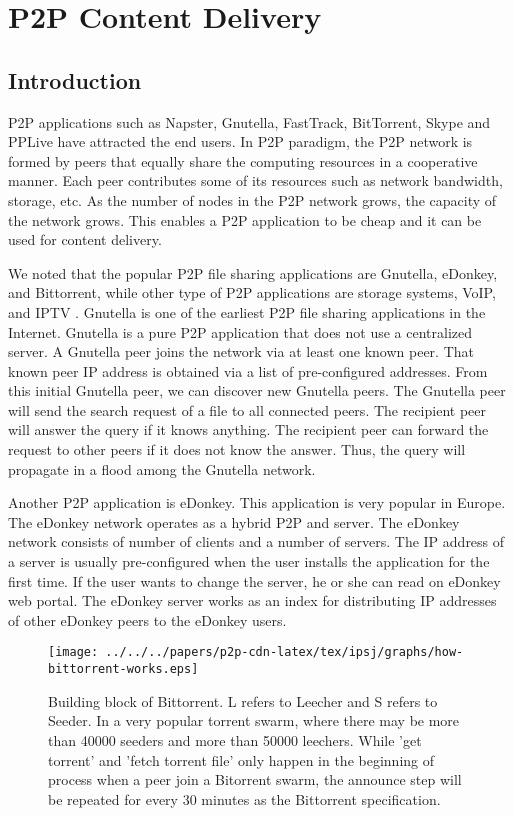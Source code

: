 \chapter{P2P Content Delivery}
\section{Introduction}

P2P applications such as Napster, Gnutella, FastTrack, BitTorrent, Skype and PPLive have attracted the end users.
In P2P paradigm, the P2P network is formed by peers that equally share the computing resources in a cooperative manner.
Each peer contributes some of its resources such as network bandwidth, storage, etc. 
As the number of nodes in the P2P network grows, the capacity of the network grows. 
This enables a P2P application to be cheap and it can be used for content delivery.  

We noted that the popular P2P file sharing applications are Gnutella, eDonkey, and Bittorrent, while other type of P2P applications are storage systems, VoIP, and IPTV \cite{5360707}.
Gnutella is one of the earliest P2P file sharing applications in the Internet.
Gnutella is a pure P2P application that does not use a centralized server.
A Gnutella peer joins the network via at least one known peer.
That known peer IP address is obtained via a list of pre-configured addresses. 
From this initial Gnutella peer, we can discover new Gnutella peers.
The Gnutella peer will send the search request of a file to all connected peers. 
The recipient peer will answer the query if it knows anything. 
The recipient peer can forward the request to other peers if it does not know the answer.
Thus, the query will propagate in a flood among the Gnutella network.

Another P2P application is eDonkey.  
This application is very popular in Europe. 
The eDonkey network operates as a hybrid P2P and server. 
The eDonkey network consists of number of  clients and a number of servers. 
The IP address of a server is usually pre-configured when the user installs the application for the first time.  
If the user wants to change the server, he or she can read on eDonkey web portal.
The eDonkey server works as an index for distributing IP addresses of other eDonkey peers to the eDonkey users.

\begin{figure}[tb]
\begin{center}
\texttt{[image: ../../../papers/p2p-cdn-latex/tex/ipsj/graphs/how-bittorrent-works.eps]}
\end{center}
\caption{Building block of Bittorrent. 
L refers to Leecher and S refers to Seeder. 
In a very popular torrent swarm, where there may be more than 40000 seeders and more than 50000 leechers.
While 'get torrent' and 'fetch torrent file' only happen in the beginning of process when a peer join a Bitorrent swarm, the announce step will be repeated for every 30 minutes as the  Bittorrent specification.} 
\label{fig:bittorrentblock}
\end{figure}

